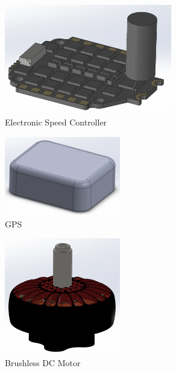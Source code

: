 \documentclass[12pt, titlepage]{article}
\begin{document}
\begin{figure}[h!]
  \begin{center} 
  \caption{Electronic Speed Controller}
  \label{Electronic Speed Controller}
        \includegraphics[width=0.65\textwidth]{CAD_ESC.png}
  \end{center}
\end{figure}

\begin{figure}[h!]
  \begin{center} 
  \caption{GPS}
  \label{GPS}
        \includegraphics[width=0.45\textwidth]{CAD_GPS.png}
  \end{center}
\end{figure}

\begin{figure}[h!]
  \begin{center} 
  \caption{Brushless DC Motor}
  \label{Brushless DC Motor}
        \includegraphics[width=0.45\textwidth]{CAD_Motor.png}
  \end{center}
\end{figure}
\end{document}
